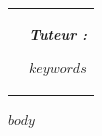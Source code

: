 \documentclass[a4paper,12pt]{article}
\begin{document}
\begin{titlepage}
\begin{center}
\begin{tabularx}{0.90\textwidth}{>{\raggedright\arraybackslash}X >{\raggedleft\arraybackslash}X}
\begin{flushleft}
\end{flushleft}

&


\begin{flushright}

\textit{\textbf{Tuteur :}}

\vspace{0.15cm}

\textsc{$keywords$}

\end{flushright}

\end{tabularx}

\end{center}

\vspace{1.3cm}

\end{titlepage}


\clearpage

\pagestyle{fancy}

\renewcommand{\contentsname}{Table des matières}

\tableofcontents


\clearpage
\setcounter{page}{4}

$body$
\end{document}
